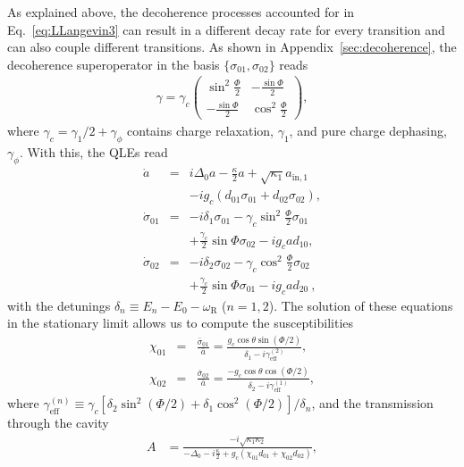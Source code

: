 \documentclass[twocolumn,english,aps,prl,preprint,reprint,showpacs,longbibliography,showkeys]{revtex4-1}
\begin{document}
As explained above, the decoherence processes accounted for in Eq.~\eqref{eq:LLangevin3} can result in  a different decay rate for every transition  and can also couple different  transitions.
As shown in Appendix~\ref{sec:decoherence}, the decoherence superoperator in the basis $\{\sigma_{01} ,\sigma_{02} \}$ reads
\begin{eqnarray}\gamma=
\gamma_c\begin{pmatrix}
\sin^2\frac{\Phi}{2} &  -\frac{\sin{\Phi}}{2} \\
-\frac{\sin{\Phi}}{2} & \cos^2\frac{\Phi}{2} 
\end{pmatrix}
,\label{eq:dmatrix}
\end{eqnarray} 
where $\gamma_c=\gamma_1/2+\gamma_{\phi}$ contains charge relaxation, $\gamma_1$, and pure charge dephasing, $\gamma_{\phi}$. 
With this, the QLEs read
\begin{eqnarray}
\dot{a}  &=& i \Delta_0 a-\frac{\kappa}{2} a+\sqrt{\kappa_1} a_{\mathrm{in},1}\nonumber\\
&& -i g_c ( d_{01}\sigma_{01}+ d_{02}\sigma_{02}), \label{eq:a}\\
\dot{\sigma}_{01} & =&-i \delta_1 \sigma_{01}-\gamma_c \sin^2\frac{\Phi}{2} \sigma_{01} \ \nonumber\\
&& +\frac{\gamma_c}{2} \sin{\Phi}\sigma_{02} -i g_c a d_{10}, \label{eq:01}\\
\dot{\sigma}_{02} & =&-i \delta_2 \sigma_{02}-\gamma_c \cos^2\frac{\Phi}{2} \sigma_{02} \nonumber\\
& &+\frac{\gamma_c}{2} \sin{\Phi}\sigma_{01} -i g_c a d_{20}
\ ,\label{eq:02}
\end{eqnarray} 
with the detunings $\delta_n\equiv E_n-E_0-\omega_{\mathrm{R}}$ ($n=1,2$). The solution of these equations in the stationary limit  allows us to  compute   the susceptibilities 
\begin{eqnarray}
\chi_{01} &=&\frac{\bar{\sigma}_{01}}{\bar{a}}=\frac{g_c \cos\theta \sin(\Phi/2)}{\delta_1-i \gamma_{\mathrm{eff}}^{(2)}},\\
\chi_{02} &=&\frac{\bar{\sigma}_{02}}{\bar{a}}=\frac{-g_c \cos\theta\cos(\Phi/2)}{\delta_2-i \gamma_{\mathrm{eff}}^{(1)}}, \label{eq:susc0102}
\end{eqnarray}
where $\gamma_{\mathrm{eff}}^{(n)}\equiv \gamma_c [\delta_2 \sin^2(\Phi/2)+\delta_1 \cos^2(\Phi/2)]/\delta_n$, and the transmission through the cavity  
\begin{align}
A  &= \frac{-i\sqrt{\kappa_1 \kappa_2}}{-\Delta_0-i\frac{\kappa}{2}+g_c \left(\chi_{01}d_{01}+\chi_{02}d_{02}\right)}, \label{eq:afinal}
\end{align}
\end{document}
